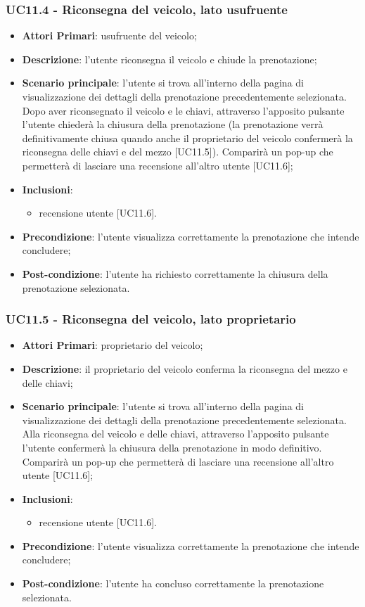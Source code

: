 \subsubsection{UC11.4 - Riconsegna del veicolo, lato usufruente}
\begin{itemize}
	\item \textbf{Attori Primari}: usufruente del veicolo;
	\item \textbf{Descrizione}: l'utente riconsegna il veicolo e chiude la prenotazione;
	\item \textbf{Scenario principale}: l'utente si trova all'interno della pagina di visualizzazione dei dettagli della prenotazione precedentemente selezionata. Dopo aver riconsegnato il veicolo e le chiavi, attraverso l'apposito pulsante l'utente chiederà la chiusura della prenotazione (la prenotazione verrà definitivamente chiusa quando anche il proprietario del veicolo confermerà la riconsegna delle chiavi e del mezzo [UC11.5]). Comparirà un pop-up che permetterà di lasciare una recensione all'altro utente [UC11.6];
	\item \textbf{Inclusioni}: 
	\begin{itemize}
		\item recensione utente [UC11.6].
	\end{itemize}
	\item \textbf{Precondizione}: l'utente visualizza correttamente la prenotazione che intende concludere;
	\item \textbf{Post-condizione}: l'utente ha richiesto correttamente la chiusura della prenotazione selezionata.
	
\end{itemize}

\subsubsection{UC11.5 - Riconsegna del veicolo, lato proprietario}
\begin{itemize}
	\item \textbf{Attori Primari}: proprietario del veicolo;
	\item \textbf{Descrizione}: il proprietario del veicolo conferma la riconsegna del mezzo e delle chiavi;
	\item \textbf{Scenario principale}: l'utente si trova all'interno della pagina di visualizzazione dei dettagli della prenotazione precedentemente selezionata. Alla riconsegna del veicolo e delle chiavi, attraverso l'apposito pulsante l'utente confermerà la chiusura della prenotazione in modo definitivo. Comparirà un pop-up che permetterà di lasciare una recensione all'altro utente [UC11.6];
	\item \textbf{Inclusioni}: 
	\begin{itemize}
		\item recensione utente [UC11.6].
	\end{itemize}
	\item \textbf{Precondizione}: l'utente visualizza correttamente la prenotazione che intende concludere;
	\item \textbf{Post-condizione}: l'utente ha concluso correttamente la prenotazione selezionata.
\end{itemize}

